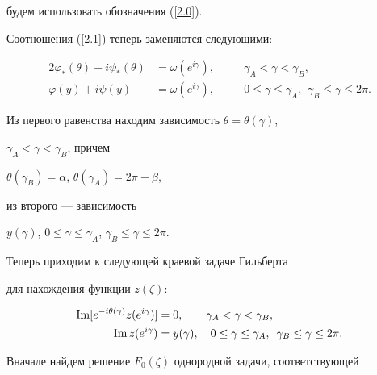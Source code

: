 {будем использовать обозначения (\ref{2.0}).





Соотношения (\ref{2.1}) теперь заменяются следующими:


\begin{alignat*}{2}


\varphi_{*}(\theta)+i\psi_{*}(\theta)&=\omega(e^{i\gamma}),&\quad


&\gamma_{A} <\gamma <\gamma_{B},\\


\varphi(y) +i\psi(y)&=\omega(e^{i\gamma}),&\quad


&0\leq\gamma\leq\gamma_{A},\ \,


\gamma_{B}\leq\gamma\leq 2\pi.


\end{alignat*}





Из первого равенства находим зависимость $\theta =\theta(\gamma)$,


$\gamma_{A} <\gamma <\gamma_{B}$, причем


$\theta (\gamma_{B})=\alpha$, $\theta (\gamma_{A})=2\pi -\beta$,


из второго --- зависимость


$y(\gamma)$, $0\leq\gamma\leq\gamma_{A}$, $\gamma_{B}\leq\gamma\leq 2\pi$.


Теперь приходим к следующей краевой задаче Гильберта


для нахождения функции $z(\zeta)$:


\begin{equation}\label{8.2}


\begin{split}


\im[e^{-i\theta(\gamma)}z(e^{i\gamma})]&=0,\qquad \gamma_{A} <\gamma


<\gamma_{B},\\


\im z(e^{i\gamma})&=y(\gamma),\quad 0\leq\gamma\leq\gamma_{A},\ \,


\gamma_{B}\leq\gamma\leq 2\pi.


\end{split}


\end{equation}





Вначале найдем решение $F_{0}(\zeta)$ однородной задачи, соответствующей


}
